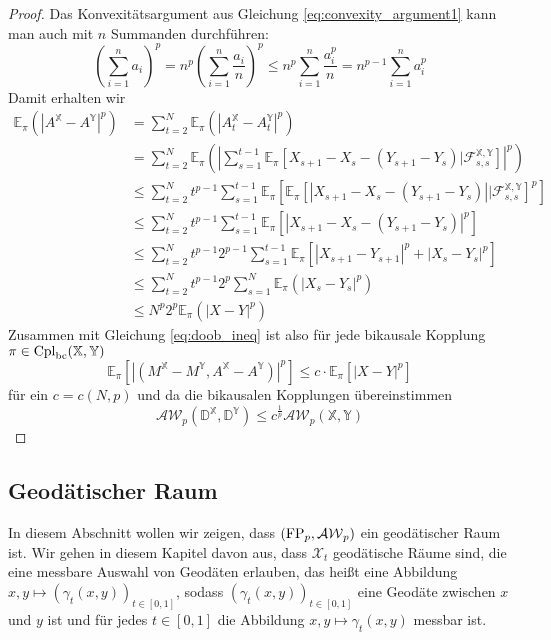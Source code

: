 \begin{proof}
    Das Konvexitätsargument aus Gleichung \ref{eq:convexity_argument1} kann man auch mit $n$ Summanden durchführen: 
    $$\left(\sum_{i=1}^n a_i\right)^p = n^{p} \left(\sum_{i=1}^n \frac{a_i}{n}\right)^p \leq n^p \sum_{i=1}^n \frac{a_i^p}{n} = n^{p-1} \sum_{i=1}^n a_i^p$$
    Damit erhalten wir 
    \begin{align*}
        \mathbb{E}_\pi(|A^\mathbb{X} - A^\mathbb{Y}|^p) &= \sum_{t=2}^N\mathbb{E}_\pi(|A_t^\mathbb{X} - A_t^\mathbb{Y}|^p) \\
        &= \sum_{t=2}^N \mathbb{E}_\pi\left(\left| \sum_{s=1}^{t-1} \mathbb{E}_\pi\left[X_{s+1} - X_{s} - (Y_{s+1} - Y_{s}) \vert \mathcal{F}_{s,s}^\mathbb{X,Y} \right]\right|^p \right) \\
        &\leq \sum_{t=2}^N t^{p-1} \sum_{s=1}^{t-1} \mathbb{E}_\pi\left[\mathbb{E}_\pi\left[ \left|X_{s+1} - X_{s} - (Y_{s+1} - Y_{s}) \right|\vert \mathcal{F}_{s,s}^\mathbb{X,Y} \right]^p\right] \\
        &\leq \sum_{t=2}^N t^{p-1}\sum_{s=1}^{t-1} \mathbb{E}_\pi\left[ \left|X_{s+1}-X_{s} - (Y_{s+1} - Y_{s}) \right|^p\right] \\
        &\leq \sum_{t=2}^N t^{p-1}2^{p-1}\sum_{s=1}^{t-1} \mathbb{E}_\pi\left[|X_{s+1} - Y_{s+1}|^p + |X_{s}-Y_{s}|^p\right] \\
        &\leq \sum_{t=2}^N t^{p-1}2^{p} \sum_{s=1}^N \mathbb{E}_\pi(|X_s - Y_s|^p) \\
        &\leq N^p2^p \mathbb{E}_\pi(|X-Y|^p)
    \end{align*}
    Zusammen mit Gleichung \ref{eq:doob_ineq} ist also für jede bikausale Kopplung $\pi \in \operatorname{Cpl}_{\operatorname{bc}}(\mathbb{X,Y})$
    $$\mathbb{E}_\pi\left[\left|(M^\mathbb{X}-M^\mathbb{Y}, A^\mathbb{X}-A^\mathbb{Y}) \right|^p \right]  \leq c\cdot \mathbb{E}_\pi \left[ \left| X-Y\right|^p\right]$$
    für ein $c=c(N,p)$ und da die bikausalen Kopplungen übereinstimmen
    $$\mathcal{AW}_p(\mathbb{D}^\mathbb{X}, \mathbb{D}^\mathbb{Y}) \leq c^\frac{1}{p} \mathcal{AW}_p(\mathbb{X,Y})$$
\end{proof}

\subsection{Geodätischer Raum}
In diesem Abschnitt wollen wir zeigen, dass $(\operatorname{FP}_p, \mathcal{AW}_p)$ ein geodätischer Raum ist. Wir gehen in diesem Kapitel davon aus, dass $\mathcal{X}_t$ geodätische Räume sind, die eine messbare Auswahl von Geodäten erlauben, das heißt eine Abbildung $x,y \mapsto (\gamma_t(x,y))_{t\in[0,1]}$, sodass $(\gamma_t(x,y))_{t\in[0,1]}$ eine Geodäte zwischen $x$ und $y$ ist und für jedes $t\in[0,1]$ die Abbildung $x,y\mapsto \gamma_t(x,y)$ messbar ist.

